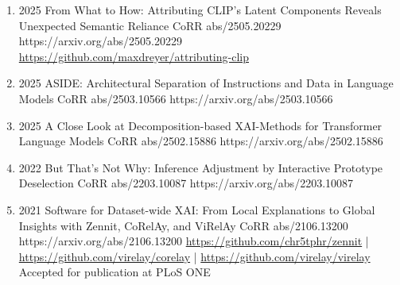 {\begin{enumerate}
    
        \item {}
                        {2025}
                        {From What to How: Attributing CLIP's Latent Components Reveals Unexpected Semantic Reliance}
                        {CoRR abs/2505.20229}
                        {https://arxiv.org/abs/2505.20229}
                        {
                            \\\href{https://github.com/maxdreyer/attributing-clip}{https://github.com/maxdreyer/attributing-clip}
                        }
             
             
        \item {}
                        {2025}
                        {ASIDE: Architectural Separation of Instructions and Data in Language Models}
                        {CoRR abs/2503.10566}
                        {https://arxiv.org/abs/2503.10566}    
                        
                        
        \item {}
                        {2025}
                        {A Close Look at Decomposition-based XAI-Methods for Transformer Language Models}
                        {CoRR abs/2502.15886}
                        {https://arxiv.org/abs/2502.15886}

        \item {}
                        {2022}
                        {But That's Not Why: Inference Adjustment by Interactive Prototype Deselection}
                        {CoRR abs/2203.10087}
                        {https://arxiv.org/abs/2203.10087}

        \item {}
                        {2021}
                        {Software for Dataset-wide XAI: From Local Explanations to Global Insights with Zennit, CoRelAy, and ViRelAy}
                        {CoRR abs/2106.13200}
                        {https://arxiv.org/abs/2106.13200}
                        {   \href{https://github.com/chr5tphr/zennit}{https://github.com/chr5tphr/zennit} | \\
                            \href{https://github.com/virelay/corelay}{https://github.com/virelay/corelay} |
                            \href{https://github.com/virelay/virelay}{https://github.com/virelay/virelay}
                            \\ Accepted for publication at PLoS ONE
                        }


\end{enumerate}}
